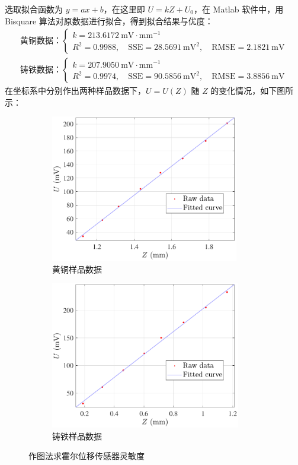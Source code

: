 \documentclass[UTF8]{article}
\theoremstyle{MyLineTheoremStyle} %
\theoremstyle{MyBlockTheoremStyle} %
\theoremstyle{MySubsubsectionStyle} %
\begin{document}
选取拟合函数为 $y = ax + b$，在这里即 $ U = kZ + U_0$，在 Matlab 软件中，用 Bisquare 算法对原数据进行拟合，得到拟合结果与优度：
\begin{gather}
\text{黄铜数据：} 
\begin{cases}
    k =   213.6172 \ \mathrm{mV \cdot mm^{-1}} 
    \\ 
    R^2 = 0.9988,\quad  \text{SSE} = 28.5691 \ \mathrm{mV^2},\quad \text{RMSE} = 2.1821 \ \mathrm{mV}
\end{cases}
\\
\text{铸铁数据：} 
\begin{cases}
    k = 207.9050 \ \mathrm{mV \cdot mm^{-1}} 
    \\ 
    R^2 = 0.9974,\quad  \text{SSE} = 90.5856 \ \mathrm{mV^2},\quad \text{RMSE} = 3.8856 \ \mathrm{mV}
\end{cases}
\end{gather}
在坐标系中分别作出两种样品数据下，$U = U(Z)$ 随 $Z$ 的变化情况，如下图所示：
\begin{figure}[H]\centering
\begin{subfigure}[b]{0.48\columnwidth}\centering
    \includegraphics[height=182pt]{assets/2 霍尔/黄铜.pdf}
    \caption{黄铜样品数据}
\end{subfigure}\hfill
\begin{subfigure}[b]{0.50\columnwidth}\centering
    \includegraphics[height=182pt]{assets/2 霍尔/铸铁.pdf}
    \caption{铸铁样品数据}
\end{subfigure}
\caption{作图法求霍尔位移传感器灵敏度}
\end{figure}
\end{document}

